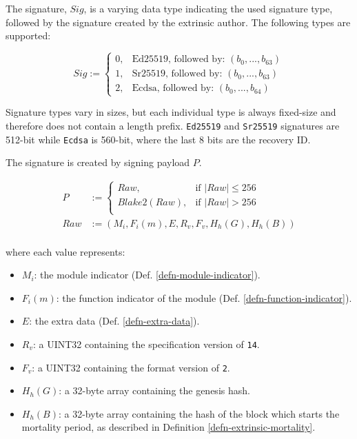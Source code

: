 \begin{definition}
    \label{defn-extrinsic-signature}
    The signature, $Sig$, is a varying data type indicating the used signature
    type, followed by the signature created by the extrinsic author. The
    following types are supported:

    \[
        Sig :=
        \begin{cases}
        0, & \text{Ed25519, followed by: } (b_0, ...,b_{63}) \\
        1, & \text{Sr25519, followed by: } (b_0, ...,b_{63}) \\
        2, & \text{Ecdsa, followed by: } (b_0, ...,b_{64})
        \end{cases}
    \]

    Signature types vary in sizes, but each individual type is always fixed-size
    and therefore does not contain a length prefix. \verb|Ed25519| and
    \verb|Sr25519| signatures are 512-bit while \verb|Ecdsa| is 560-bit, where
    the last 8 bits are the recovery ID.
    \newline

    The signature is created by signing payload $P$.

    \begin{equation}
        \begin{aligned}
        P &:= \begin{cases}
            Raw, & \text{if } |Raw| \leq 256\\
            Blake2(Raw), & \text{if } |Raw| > 256\\
        \end{cases}\\
        Raw &:= (M_i, F_i(m), E, R_v, F_v, H_h(G), H_h(B))\\
        \end{aligned}
    \end{equation}

    where each value represents:
    \begin{itemize}
        \item $M_i$: the module indicator (Def. \ref{defn-module-indicator}).
        \item $F_i(m)$: the function indicator of the module
        (Def. \ref{defn-function-indicator}).
        \item $E$: the extra data (Def. \ref{defn-extra-data}).
        \item $R_v$: a UINT32 containing the specification version of \verb|14|.
        \item $F_v$: a UINT32 containing the format version of \verb|2|.
        \item $H_h(G)$: a 32-byte array containing the genesis hash.
        \item $H_h(B)$: a 32-byte array containing the hash of the block which
        starts the mortality period, as described in Definition
        \ref{defn-extrinsic-mortality}.
    \end{itemize}
\end{definition}

